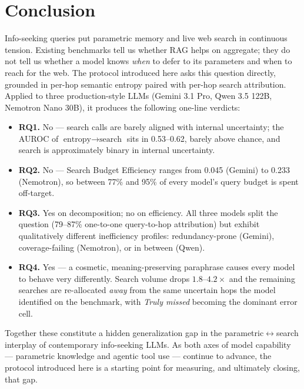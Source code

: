 \documentclass[10pt,letterpaper]{article}
\begin{document}
\section{Conclusion}

Info-seeking queries put parametric memory and live web search in continuous tension.
Existing benchmarks tell us whether RAG helps on aggregate; they do not tell us
whether a model knows \emph{when} to defer to its parameters and when to reach for the
web. The protocol introduced here asks this question directly, grounded in per-hop
semantic entropy paired with per-hop search attribution. Applied to three
production-style LLMs (Gemini 3.1 Pro, Qwen 3.5 122B, Nemotron Nano 30B), it produces
the following one-line verdicts:
\begin{itemize}[leftmargin=*,itemsep=2pt]
\item \textbf{RQ1.} No --- search calls are barely aligned with internal uncertainty;
the AUROC of $\text{entropy}\rightarrow\text{search}$ sits in 0.53--0.62, barely
above chance, and search is approximately binary in internal uncertainty.
\item \textbf{RQ2.} No --- Search Budget Efficiency ranges from 0.045 (Gemini) to
0.233 (Nemotron), so between 77\% and 95\% of every model's query budget is spent
off-target.
\item \textbf{RQ3.} Yes on decomposition; no on efficiency. All three models split
the question (79--87\% one-to-one query-to-hop attribution) but exhibit qualitatively
different inefficiency profiles: redundancy-prone (Gemini), coverage-failing
(Nemotron), or in between (Qwen).
\item \textbf{RQ4.} Yes --- a cosmetic, meaning-preserving paraphrase causes every
model to behave very differently. Search volume drops $1.8$--$4.2\times$ and the
remaining searches are re-allocated \emph{away} from the same uncertain hops the
model identified on the benchmark, with \emph{Truly missed} becoming the dominant
error cell.
\end{itemize}
Together these constitute a hidden generalization gap in the
parametric$\leftrightarrow$search interplay of contemporary info-seeking LLMs. As both
axes of model capability --- parametric knowledge and agentic tool use --- continue to
advance, the protocol introduced here is a starting point for measuring, and
ultimately closing, that gap.
\end{document}
